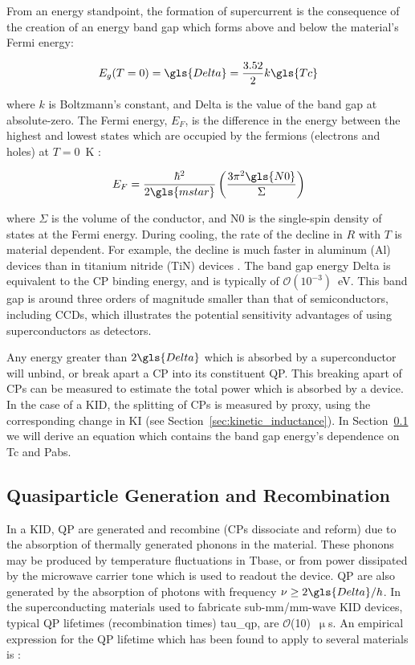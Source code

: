 From an energy standpoint, the formation of supercurrent is the consequence of the creation of an energy band gap which forms above and below the material's Fermi energy:

\begin{equation}\label{eq:bandgap}
  E_{g}(T = 0) = \gls{Delta} = \frac{3.52}{2}k\gls{Tc}
\end{equation}

where $k$ is Boltzmann's constant, and \gls{Delta} is the value of the band gap at absolute-zero. The Fermi energy, $E_{F}$, is the difference in the energy between the highest and lowest states which are occupied by the fermions (electrons and holes) at $T = 0$~K \citep{kittel1998thermal}:

\begin{equation}\label{eq:Fermi_energy}
  E_{F} = \frac{\hbar^{2}}{2 \gls{mstar}}\left( \frac{3 \pi^{2} \gls{N0}}{\Sigma} \right)
\end{equation}

where $\Sigma$ is the volume of the conductor, and \gls{N0} is the single-spin density of states at the Fermi energy. During cooling, the rate of the decline in $R$ with $T$ is material dependent. For example, the decline is much faster in aluminum (Al) devices than in titanium nitride (TiN) devices \citep{mauskopf2018transition}. The band gap energy \gls{Delta} is equivalent to the CP binding energy, and is typically of $\mathcal{O}(10^{-3})$~eV. This band gap is around three orders of magnitude smaller than that of semiconductors, including CCDs, which illustrates the potential sensitivity advantages of using superconductors as detectors.

Any energy greater than $2\gls{Delta}$ which is absorbed by a superconductor will unbind, or break apart a CP into its constituent QP. This breaking apart of CPs can be measured to estimate the total power which is absorbed by a device. In the case of a KID, the splitting of CPs is measured by proxy, using the corresponding change in KI (see Section~\ref{sec:kinetic_inductance}). In Section~\ref{QP} we will derive an equation which contains the band gap energy's dependence on \gls{Tc} and \gls{Pabs}.

\subsection{Quasiparticle Generation and Recombination}\label{QP}

In a KID, QP are generated and recombine (CPs dissociate and reform) due to the absorption of thermally generated phonons in the material. These phonons may be produced by temperature fluctuations in \gls{Tbase}, or from power dissipated by the microwave carrier tone which is used to readout the device. QP are also generated by the absorption of photons with frequency $\nu \geq 2\gls{Delta}/h$. In the superconducting materials used to fabricate sub-mm/mm-wave KID devices, typical QP lifetimes (recombination times) \gls{tau_qp}, are $\mathcal{O}$(10)~$\upmu$s. An empirical expression for the QP lifetime which has been found to apply to several materials is \citep{zmuidzinas2012superconducting}:

